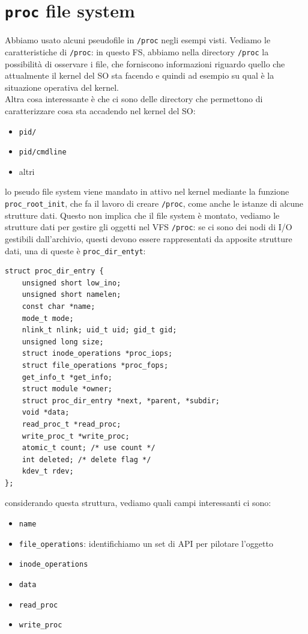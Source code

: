 \documentclass[12pt, oneside]{extbook}
\begin{document}
\section{\texttt{proc} file system}
Abbiamo usato alcuni pseudofile in \texttt{/proc} negli esempi visti. Vediamo le caratteristiche di \texttt{/proc}: in questo FS, abbiamo nella directory \texttt{/proc} la possibilità di osservare i file, che forniscono informazioni riguardo quello che attualmente il kernel del SO sta facendo e quindi ad esempio su qual è la situazione operativa del kernel.\\Altra cosa interessante è che ci sono delle directory che permettono di caratterizzare cosa sta accadendo nel kernel del SO:
\begin{itemize}
	\item \texttt{pid/}
	\item \texttt{pid/cmdline}
	\item altri
\end{itemize}
lo pseudo file system viene mandato in attivo nel kernel mediante la funzione \texttt{proc\_root\_init}, che fa il lavoro di creare \texttt{/proc}, come anche le istanze di alcune strutture dati. Questo non implica che il file system è montato, vediamo le strutture dati per gestire gli oggetti nel VFS \texttt{/proc}: se ci sono dei nodi di I/O gestibili dall'archivio, questi devono essere rappresentati da apposite strutture dati, una di queste è \texttt{proc\_dir\_entyt}:
\begin{lstlisting}
struct proc_dir_entry {
	unsigned short low_ino;
	unsigned short namelen;
	const char *name;
	mode_t mode;
	nlink_t nlink; uid_t uid; gid_t gid;
	unsigned long size;
	struct inode_operations *proc_iops;
	struct file_operations *proc_fops;
	get_info_t *get_info;
	struct module *owner;
	struct proc_dir_entry *next, *parent, *subdir;
	void *data;
	read_proc_t *read_proc;
	write_proc_t *write_proc;
	atomic_t count; /* use count */
	int deleted; /* delete flag */
	kdev_t rdev;
};
\end{lstlisting}
considerando questa struttura, vediamo quali campi interessanti ci sono:
\begin{itemize}
	\item \texttt{name}
	\item \texttt{file\_operations}: identifichiamo un set di API per pilotare l'oggetto
	\item \texttt{inode\_operations}
	\item \texttt{data}
	\item \texttt{read\_proc}
	\item \texttt{write\_proc}
\end{itemize}
\end{document}

